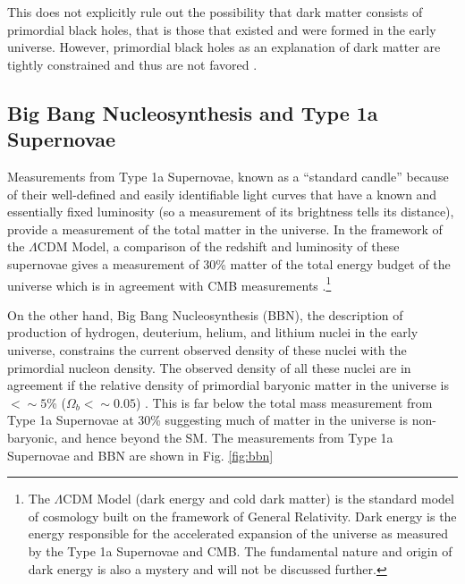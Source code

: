 This does not explicitly rule out the possibility that dark matter consists of primordial black holes, that is those that existed and were formed in the early universe. However, primordial black holes as an explanation of dark matter are tightly constrained and thus are not favored \cite{carr2020constraints}.  %

\clearpage

\subsection{Big Bang Nucleosynthesis and Type 1a Supernovae}\label{sec:bbn}

Measurements from Type 1a Supernovae, known as a ``standard candle'' because of their well-defined and easily identifiable light curves that have a known and essentially fixed luminosity (so a measurement of its brightness tells its distance), provide a measurement of the total matter in the universe. In the framework of the $\Lambda$CDM Model, a comparison of the redshift and luminosity of these supernovae gives a measurement of 30\% matter of the total energy budget of the universe which is in agreement with CMB measurements \cite{Amanullah_2010}.\footnote{The $\Lambda$CDM Model (dark energy and cold dark matter) is the standard model of cosmology built on the framework of General Relativity. Dark energy is the energy responsible for the accelerated expansion of the universe as measured by the Type 1a Supernovae and CMB. The fundamental nature and origin of dark energy is also a mystery and will not be discussed further.}

On the other hand, Big Bang Nucleosynthesis (BBN), the description of production of hydrogen, deuterium, helium, and lithium nuclei in the early universe, constrains the current observed density of these nuclei with the primordial nucleon density. The observed density of all these nuclei are in agreement if the relative density of primordial baryonic matter in the universe is $<\sim5$\% ($\Omega_b< \sim 0.05$) \cite{1998RvMP...70..303S}. This is far below the total mass measurement from Type 1a Supernovae at 30\% suggesting much of matter in the universe is non-baryonic, and hence beyond the SM. The measurements from Type 1a Supernovae and BBN are shown in Fig. \ref{fig:bbn}


